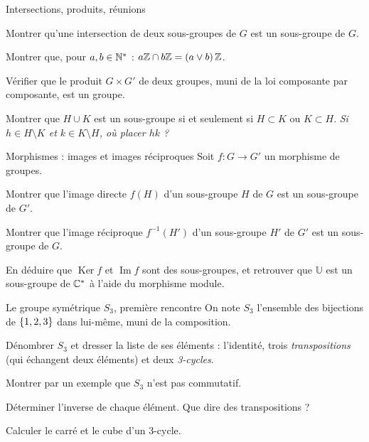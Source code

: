 \begin{exercice}[2]{Intersections, produits, réunions}
\begin{questions}
  \item Montrer qu'une intersection de deux sous-groupes de $G$ est un
    sous-groupe de $G$.
  \item Montrer que, pour $a,b\in\mathbb{N}^{*}$ :
    $a\mathbb{Z}\cap b\mathbb{Z}=(a\vee b)\,\mathbb{Z}$.
  \item Vérifier que le produit $G\times G'$ de deux groupes, muni de la
    loi composante par composante, est un groupe.
  \item Montrer que $H\cup K$ est un sous-groupe si et seulement si
    $H\subset K$ ou $K\subset H$.
    \emph{Si $h\in H\setminus K$ et $k\in K\setminus H$, où placer $hk$ ?}
\end{questions}
\end{exercice}

\begin{exercice}[2]{Morphismes : images et images réciproques}
Soit $f:G\to G'$ un morphisme de groupes.
\begin{questions}
  \item Montrer que l'image directe $f(H)$ d'un sous-groupe $H$ de $G$ est
    un sous-groupe de $G'$.
  \item Montrer que l'image réciproque $f^{-1}(H')$ d'un sous-groupe $H'$
    de $G'$ est un sous-groupe de $G$.
  \item En déduire que $\operatorname{Ker}f$ et $\operatorname{Im}f$ sont
    des sous-groupes, et retrouver que $\mathbb{U}$ est un sous-groupe de
    $\mathbb{C}^{*}$ à l'aide du morphisme module.
\end{questions}
\end{exercice}

\begin{exercice}[2]{Le groupe symétrique $S_3$, première rencontre}
On note $S_3$ l'ensemble des bijections de $\left\{1,2,3\right\}$ dans lui-même,
muni de la composition.
\begin{questions}
  \item Dénombrer $S_3$ et dresser la liste de ses éléments : l'identité,
    trois \emph{transpositions} (qui échangent deux éléments) et deux
    \emph{3-cycles}.
  \item Montrer par un exemple que $S_3$ n'est pas commutatif.
  \item Déterminer l'inverse de chaque élément. Que dire des
    transpositions ?
  \item Calculer le carré et le cube d'un 3-cycle.
\end{questions}
\end{exercice}

